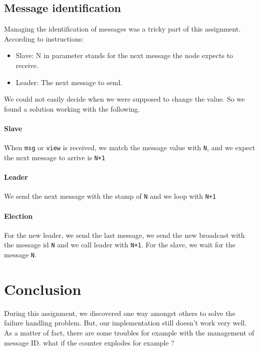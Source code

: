 \documentclass[a4paper, 11pt]{article}
\begin{document}
\subsection{Message identification}
Managing the identification of messages was a tricky part of this assignment. According to instructions:
\begin{itemize}
\item Slave: N in parameter stands for the next message the node expects to receive.
\item Leader: The next message to send.
\end{itemize}
We could not easily decide when we were supposed to change the value. So we found a solution working with the following.\\
\paragraph{Slave} When \lstinline!msg! or \lstinline!view! is received, we match the message value with \lstinline!N!, and we expect the next message to arrive is \lstinline!N+1!
\paragraph{Leader}We send the next message with the stamp of \lstinline!N! and we loop with \lstinline!N+1!
\paragraph{Election} For the new leader, we send the last message, we send the new broadcast with the message id \lstinline!N! and we call leader with \lstinline!N+1!.
For the slave, we wait for the message \lstinline!N!.

\section{Conclusion}
During this assignment, we discovered one way amongst others to solve the failure handling problem. But, our implementation still doesn't work very well. As a matter of fact, there are some troubles for example with the management of message ID. what if the counter explodes for example ?
\end{document}

